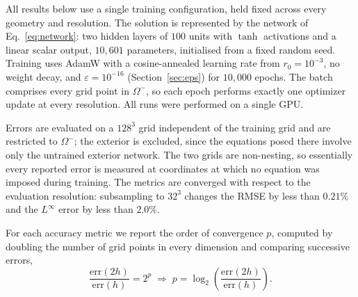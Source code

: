 
All results below use a single training configuration, held fixed across every
geometry and resolution. The solution is represented by the network of
Eq.~\eqref{eq:network}: two hidden layers of $100$ units with $\tanh$ activations and a
linear scalar output, $10{,}601$ parameters, initialised from a fixed random seed.
Training uses AdamW with a cosine-annealed learning rate from $r_0 = 10^{-3}$, no weight
decay, and $\varepsilon = 10^{-16}$ (Section~\ref{sec:eps}) for $10{,}000$ epochs. The
batch comprises every grid point in $\Omega^{-}$, so each epoch performs exactly one
optimizer update at every resolution. All runs were performed on a single GPU.

Errors are evaluated on a $128^{3}$ grid independent of the training grid and are
restricted to $\Omega^{-}$; the exterior is excluded, since the equations posed there
involve only the untrained exterior network. The two grids are non-nesting, so
essentially every reported error is measured at coordinates at which no equation was
imposed during training. The metrics are converged with respect to the evaluation
resolution: subsampling to $32^{3}$ changes the RMSE by less than $0.21\%$ and the
$L^{\infty}$ error by less than $2.0\%$.

For each accuracy metric we report the order of convergence $p$, computed by doubling
the number of grid points in every dimension and comparing successive errors,
\begin{equation}
  \frac{\mathrm{err}(2h)}{\mathrm{err}(h)} = 2^{p}
  \;\Rightarrow\;
  p = \log_{2}\!\left(\frac{\mathrm{err}(2h)}{\mathrm{err}(h)}\right).
  \label{eq:order}
\end{equation}
